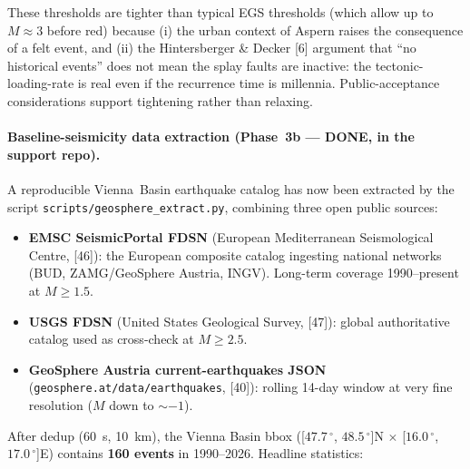 \documentclass{article}
\begin{document}
These thresholds are tighter than typical EGS thresholds (which
allow up to $M \approx 3$ before red) because (i) the urban
context of Aspern raises the consequence of a felt event, and
(ii) the Hintersberger \& Decker [6] argument that
``no historical events'' does not mean the splay faults are
inactive: the tectonic-loading-rate is real even if the
recurrence time is millennia. Public-acceptance considerations
support tightening rather than relaxing.

\paragraph{Baseline-seismicity data extraction (Phase~3b ---
DONE, in the support repo).} A reproducible Vienna~Basin
earthquake catalog has now been extracted by the script
\texttt{scripts/geosphere\_extract.py}, combining three open public
sources:

\begin{itemize}
\item \textbf{EMSC SeismicPortal FDSN} (European Mediterranean
Seismological Centre, [46]): the European composite catalog
ingesting national networks (BUD, ZAMG/GeoSphere Austria, INGV).
Long-term coverage 1990--present at $M\geq 1.5$.
\item \textbf{USGS FDSN} (United States Geological Survey, [47]):
global authoritative catalog used as cross-check at $M\geq 2.5$.
\item \textbf{GeoSphere Austria current-earthquakes JSON}
(\texttt{geosphere.at/data/earthquakes}, [40]): rolling 14-day
window at very fine resolution ($M$ down to $\sim -1$).
\end{itemize}

After dedup (60~s, 10~km), the Vienna Basin bbox
([$47.7\,^\circ$, $48.5\,^\circ$]N $\times$ [$16.0\,^\circ$,
$17.0\,^\circ$]E) contains \textbf{160 events} in 1990--2026.
Headline statistics:
\end{document}
